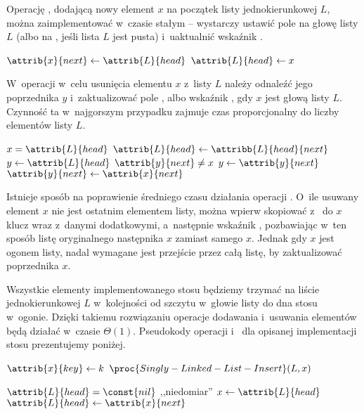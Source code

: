 
\exercise %
Operację , dodającą nowy element $x$ na początek listy jednokierunkowej $L$, można zaimplementować w~czasie stałym -- wystarczy ustawić pole  na głowę listy $L$ (albo na , jeśli lista $L$ jest pusta) i~uaktualnić wskaźnik .
\begin{codebox}
\li	$\attrib{x}{next}\gets\attrib{L}{head}$
\li	$\attrib{L}{head}\gets x$
\end{codebox}

W~operacji  w~celu usunięcia elementu $x$ z~listy $L$ należy odnaleźć jego poprzednika $y$ i~zaktualizować pole , albo wskaźnik , gdy $x$ jest głową listy $L$.
Czynność ta w~najgorszym przypadku zajmuje czas proporcjonalny do liczby elementów listy $L$.
\begin{codebox}
\li	\If $x=\attrib{L}{head}$
\li		\Then $\attrib{L}{head}\gets\attribb{L}{head}{next}$
\li		\Else $y\gets\attrib{L}{head}$
\li			\While $\attrib{y}{next}\ne x$
\li				\Do $y\gets\attrib{y}{next}$
				\End
\li			$\attrib{y}{next}\gets\attrib{x}{next}$
		\End
\end{codebox}

Istnieje sposób na poprawienie średniego czasu działania operacji .
O~ile usuwany element $x$ nie jest ostatnim elementem listy, można wpierw skopiować z~ do $x$ klucz wraz z~danymi dodatkowymi, a~następnie wskaźnik , pozbawiając w~ten sposób listę oryginalnego następnika $x$ zamiast samego $x$.
Jednak gdy $x$ jest ogonem listy, nadal wymagane jest przejście przez całą listę, by zaktualizować poprzednika $x$.

\exercise %
Wszystkie elementy implementowanego stosu będziemy trzymać na liście jednokierunkowej $L$ w~kolejności od szczytu w~głowie listy do dna stosu w~ogonie.
Dzięki takiemu rozwiązaniu operacje dodawania i~usuwania elementów będą działać w~czasie $\Theta(1)$.
Pseudokody operacji  i~ dla opisanej implementacji stosu prezentujemy poniżej.
\begin{codebox}
\li	$\attrib{x}{key}\gets k$
\li $\proc{Singly-Linked-List-Insert}(L,x)$
\end{codebox}

\begin{codebox}
\li	\If $\attrib{L}{head}=\const{nil}$
\li		\Then \Error ,,niedomiar''
		\End
\li	$x\gets\attrib{L}{head}$
\li	$\attrib{L}{head}\gets\attrib{x}{next}$
\li	\Return {}
\end{codebox}

